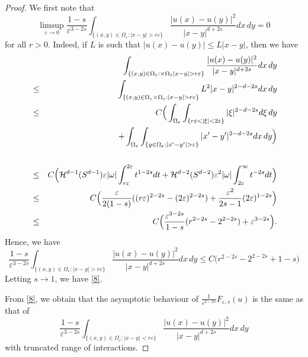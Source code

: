 \documentclass{article}
\newcommand{\e}{\varepsilon}
\begin{document}
\begin{proof}
We first note that 
\begin{equation}\label{8}
\limsup_{\e\to 0} \frac{1-s}{\e^{3-2s}} \int_{\{(x,y)\in\Omega_\e: |x-y|>r\e\}}\frac{|u(x)-u(y)|^2}{|x-y|^{d+2s}} dx\,dy=0
\end{equation}
for all $r>0$.
Indeed, if $L$ is such that $|u(x)-u(y)|\le L|x-y|$, then we have
\begin{eqnarray*}&&
\hskip-1cm\int_{\{(x,y)\in\Omega_\e:\times\Omega_\e |x-y|>r\e\}}\frac{|u(x)-u(y)|^2}{|x-y|^{d+2s}} dx\,dy\\
&\le& \int_{\{(x,y)\in\Omega_\e\times\Omega_\e: |x-y|>r\e\}}L^2|x-y|^{2-d-2s} dx\,dy\\
&\le& C\Big(\int_{\Omega_\e} \int_{\{r\e<|\xi|<2\e\}}|\xi|^{2-d-2s} d\xi\,dy\\
&&+
\int_{\Omega_\e}\int_{\{y\in\Omega_\e: |x'-y'|>\e\}}|x'-y'|^{2-d-2s} dx\,dy\Big)\\\\
&\le& C\Big( \mathcal H^{d-1}(S^{d-1})\e|\omega| \int_{r\e}^{2\e}t^{1-2s} dt +
\mathcal H^{d-2}(S^{d-2})\e^2 |\omega| \int_{2\e}^{\infty}t^{-2s}dt\Big)
\\
&\le& C\Big(\frac{\e}{2(1-s)}((r\e)^{2-2s}-(2\e)^{2-2s})+\frac{\e^2}{2s-1}(2\e)^{1-2s}\Big)\\
&\le& C\Big( \frac{\e^{3-2s}}{1-s}(r^{2-2s}-2^{2-2s})+ \e^{3-2s}\Big).
\end{eqnarray*}
Hence, we have
\begin{equation}\label{a1}
\frac{1-s}{\e^{3-2s}} \int_{\{(x,y)\in\Omega_\e: |x-y|>r\e\}}\frac{|u(x)-u(y)|^2}{|x-y|^{d+2s}} dx\,dy\le C\big(r^{2-2s}-2^{2-2s}+ 1-s\big)
\end{equation}
Letting $s\to 1$, we have \eqref{8}.

From \eqref{8}, we obtain that the asymptotic behaviour of $\frac{1}{\e^{2-2s}}F_{\e,s}(u)$ is the same as that
of
$$
\frac{1-s}{\e^{3-2s}} \int_{\{(x,y)\in\Omega_\e: |x-y|<r\e\}}\frac{|u(x)-u(y)|^2}{|x-y|^{d+2s}} dx\,dy
$$
with truncated range of interactions.


\end{proof}
\end{document}
